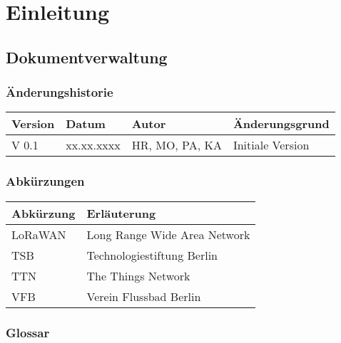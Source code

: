 \section{Einleitung}

\subsection{Dokumentverwaltung}

\subsubsection{Änderungshistorie}

\begin{table}[H] %
\begin{tabularx}{\textwidth}{ |X|X|X|X| }
	\hline  %
	\rowcolor[gray]{.8}%
	\rule{0pt}{18pt}%
	\textbf{Version} & \textbf{Datum} & \textbf{Autor} & \textbf{Änderungsgrund} \\
	\hline  %
	V 0.1 & xx.xx.xxxx & HR, MO, PA, KA & Initiale Version \\
	\hline
\end{tabularx}
\end{table}

\subsubsection{Abkürzungen}

\begin{table}[H] %
	\centering
	\begin{tabular}{ |l|l| } %
		\hline  %
		\rowcolor[gray]{.8}%
		\rule{0pt}{18pt}%
		\textbf{Abkürzung} & \textbf{Erläuterung} \\
		\hline  %
		LoRaWAN & Long Range Wide Area Network \\
		\hline
		TSB & Technologiestiftung Berlin \\
		\hline
		TTN & The Things Network \\
		\hline
		VFB & Verein Flussbad Berlin \\
		\hline
	\end{tabular}
\end{table}

\subsubsection{Glossar}

